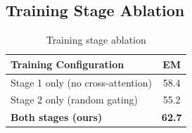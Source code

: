 \documentclass[10pt,twocolumn]{article}
\begin{document}
\subsection{Training Stage Ablation}

\begin{table}[h]
\centering
\caption{Training stage ablation}
\small
\begin{tabular}{@{}lc@{}}
\toprule
\textbf{Training Configuration} & \textbf{EM} \\
\midrule
Stage 1 only (no cross-attention) & 58.4 \\
Stage 2 only (random gating) & 55.2 \\
\textbf{Both stages (ours)} & \textbf{62.7} \\
\bottomrule
\end{tabular}
\end{table}
\end{document}
